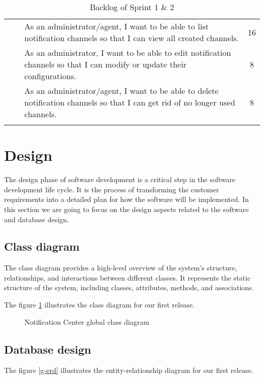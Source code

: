 \begin{longtable}{ | m{}  | m{} | m{} | c | }
    \cline{3-4}
                            &                                                     & As an administrator/agent, I want to be able to list notification channels so that I can view all created channels.                   & 16                  \\
    \cline{3-4}
                            &                                                     & As an administrator, I want to be able to edit notification channels so that I can modify or update their configurations.             & 8                   \\
    \cline{3-4}
                            &                                                     & As an administrator/agent, I want to be able to delete notification channels so that I can get rid of no longer used channels.        & 8                   \\
    \hline
    \caption{Backlog of Sprint 1 \& 2}
\end{longtable}

\section{Design}
The design phase of software development is a critical step in the software development life cycle.
It is the process of transforming the customer requirements into a detailed plan for how the software
will be implemented. In this section we are going to focus on the design aspects related to the software
and database design.

\subsection{Class diagram}
The class diagram provides a high-level overview of the system's structure, relationships,
and interactions between different classes. It represents the static structure of the system,
including classes, attributes, methods, and associations.

The figure \ref{g-class} illustrates the class diagram for our first release.

\begin{figure}[hbt!]
    \centering
    
    \caption{Notification Center global class diagram}
    \label{g-class}
\end{figure}

\subsection{Database design}
The figure \ref{g-erd}  illustrates the entity-relationship diagram for our first release.


